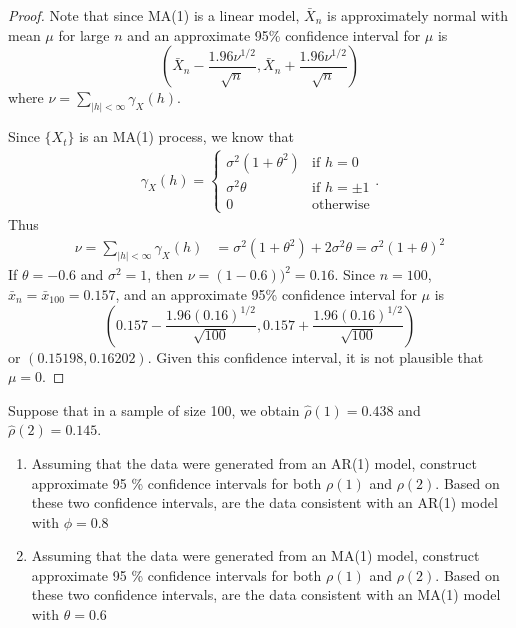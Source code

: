 \documentclass[12pt]{article}
\theoremstyle{definition}
\newenvironment{custompbm}[1]
  {\renewcommand\theproblem{#1}\problem}
  {\endproblem}
\begin{document}
\begin{proof}
  Note that since MA(1) is a linear model, $\bar{X}_{n}$ is approximately normal
  with mean $\mu$ for large $n$ and an approximate 95\% confidence interval for
  $\mu$ is
  \[
    \left(\bar{X}_{n} - \frac{1.96\nu^{1/2}}{\sqrt{n}}, \bar{X}_{n} + \frac{1.96\nu^{1/2}}{\sqrt{n}}\right)
  \]
  where $\nu = \sum_{|h|<\infty}\gamma_X(h)$.

  Since $\{X_t\}$ is an MA(1) process, we know that
  \begin{align*}
    \gamma_X(h) =
    \begin{cases}
      \sigma^2(1+\theta^2) & \text{if $h=0$}\\
      \sigma^2\theta & \text{if $h=\pm 1$}\\
      0 & \text{otherwise}
    \end{cases}.
  \end{align*}
  Thus
  \begin{align*}
    \nu = \sum_{|h| < \infty} \gamma_X(h)
    &= \sigma^2(1+\theta^2) +2\sigma^2\theta = \sigma^2(1+\theta)^2
  \end{align*}
  If $\theta = -0.6$ and $\sigma^2 = 1$, then $\nu = (1 - 0.6))^2 = 0.16$. Since $n=100$,
  $\bar{x}_{n} = \bar{x}_{100} = 0.157$, and an approximate 95\% confidence interval
  for $\mu$ is
  \[
    \left(0.157 - \frac{1.96(0.16)^{1/2}}{\sqrt{100}}, 0.157 + \frac{1.96(0.16)^{1/2}}{\sqrt{100}}\right)
  \]
  or $(0.15198, 0.16202)$. Given this confidence interval, it is not plausible that
  $\mu = 0.$
\end{proof}


\begin{custompbm}{2.13}
  Suppose that in a sample of size 100, we obtain $\hat{\rho}(1) = 0.438$
  and $\hat{\rho}(2) = 0.145$.
  \begin{enumerate}
    \item Assuming that the data were generated from an AR(1) model, construct
      approximate 95 \% confidence intervals for both $\rho(1)$ and $\rho(2)$.
      Based on these two confidence intervals, are the data consistent with an
      AR(1) model with $\phi = 0.8$
    \item Assuming that the data were generated from an MA(1) model, construct
      approximate 95 \% confidence intervals for both $\rho(1)$ and $\rho(2)$.
      Based on these two confidence intervals, are the data consistent with an
      MA(1) model with $\theta = 0.6$
  \end{enumerate}
\end{custompbm}
\end{document}
